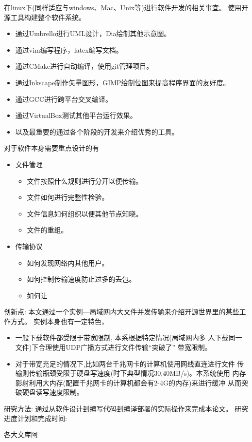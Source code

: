 \documentclass{data/hbue}
\begin{document}
\reportcontent
{
在linux下(同样适应与windows、Mac、Unix等)进行软件开发的相关事宜。
使用开源工具构建整个软件系统。
\begin{itemize}
	\item 通过Umbrello进行UML设计，Dia绘制其他示意图。
	\item 通过vim编写程序，latex编写文档。
	\item 通过CMake进行自动编译，使用git管理项目。
	\item 通过Inkscape制作矢量图形，GIMP绘制位图来提高程序界面的友好度。
	\item 通过GCC进行跨平台交叉编译。
	\item 通过VirtualBox测试其他平台运行效果。
	\item 以及最重要的通过各个阶段的开发来介绍优秀的工具。
\end{itemize}

对于软件本身需要重点设计的有
\begin{itemize}
	\item 文件管理
		\begin{itemize}
			\item 文件按照什么规则进行分开以便传输。
			\item 文件如何进行完整性检验。
			\item 文件信息如何组织以便其他节点知晓。
			\item 文件的重组。
		\end{itemize}
	\item 传输协议
		\begin{itemize}
			\item 如何发现网络内其他用户。
			\item 如何控制传输速度防止过多的丢包。
			\item 如何让
		\end{itemize}
\end{itemize}

}

\reportschedule
{
创新点:
本文通过一个实例---局域网内大文件并发传输来介绍开源世界里的某些工作方式。
实例本身也有一定特色，
\begin{itemize}
	\item 一般下载软件都受限于带宽限制, 本系根据特定情况(局域网内多
		人下载同一文件)下合理使用UDP广播方式进行文件传输``突破了''
		带宽限制。
	\item 对于带宽充足的情况下,比如两台千兆网卡的计算机使用网线直连进行文件
		传输则传输瓶颈受限于硬盘写速度(时下典型情况30,40MB/s)。本系统使用
		内存影射利用大内存(配置千兆网卡的计算机都会有2-4G的内存)来进行缓冲
		从而突破硬盘读写速度限制。
\end{itemize}

研究方法: 
通过从软件设计到编写代码到编译部署的实际操作来完成本论文。
研究进度计划和完成时间:
}

\reportreference
{
各大文库阿
}

\reportsuggestion
{
}


\end{document}
